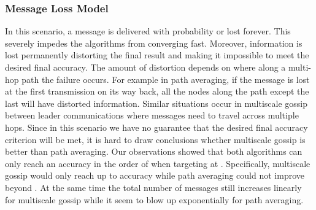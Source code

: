 \subsubsection{Message Loss Model}

In this scenario, a message is delivered with probability  or lost forever. This severely impedes the algorithms from converging fast. Moreover, information is lost permanently distorting the final result and making it impossible to meet the desired final accuracy. The amount of distortion depends on where along a multi-hop path the failure occurs. For example in path averaging, if the message is lost at the first transmission on its way back, all the nodes along the path except the last will have distorted information. Similar situations occur in multiscale gossip between leader communications where messages need to travel across multiple hops. Since in this scenario we have no guarantee that the desired final accuracy criterion will be met, it is hard to draw conclusions whether multiscale gossip is better than path averaging. Our observations showed that both algorithms can only reach an accuracy in the order of  when targeting at . Specifically, multiscale gossip would only reach up to  accuracy while path averaging could not improve beyond .  At the same time the total number of messages still increases linearly for multiscale gossip while it seem to blow up exponentially for path averaging. 




%
